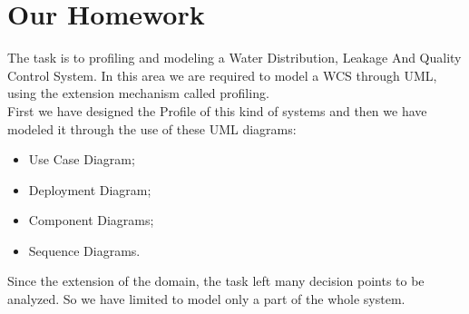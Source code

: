 \chapter{\textbf{Our Homework}}
The task is to profiling and modeling a Water Distribution, Leakage And Quality Control System. In this area we are required to model a WCS through UML, using the extension mechanism called profiling.
\\First we have designed the Profile of this kind of systems and then we have modeled it through the use of these UML diagrams:
\begin{itemize}
	\item Use Case Diagram;
	\item Deployment Diagram;
	\item Component Diagrams;
	\item Sequence Diagrams.
\end{itemize}
Since the extension of the domain, the task left many decision points to be analyzed. So we have limited to model only a part of the whole system.
